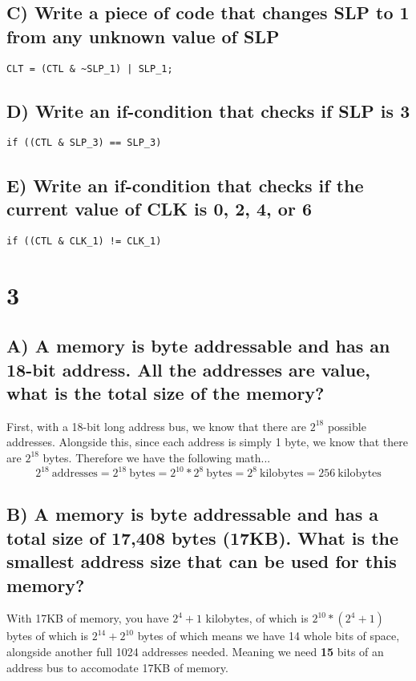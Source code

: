 \documentclass{article}
\begin{document}
\subsection{C) Write a piece of code that changes SLP to 1 from any unknown value of SLP}
\begin{lstlisting}
CLT = (CTL & ~SLP_1) | SLP_1;
\end{lstlisting}

\subsection{D) Write an if-condition that checks if SLP is 3}
\begin{lstlisting}
if ((CTL & SLP_3) == SLP_3)
\end{lstlisting}

\subsection{E) Write an if-condition that checks if the current value of CLK is 0, 2, 4, or 6}
\begin{lstlisting}
if ((CTL & CLK_1) != CLK_1)
\end{lstlisting}

\section{3}
\subsection{A) A memory is byte addressable and has an 18-bit address. All the addresses are value, what is the total size of the memory?}
First, with a 18-bit long address bus, we know that there are $2^18$ possible addresses. Alongside this, since each address is simply 1 byte, we know that there are $2^18$ bytes. Therefore we have the following math...
$$ 2^{18}\ \text{addresses} = 2^{18}\ \text{bytes} = 2^{10}*2^8\ \text{bytes} = 2^8\ \text{kilobytes} = 256\ \text{kilobytes}$$

\subsection{B) A memory is byte addressable and has a total size of 17,408 bytes (17KB). What is the smallest address size that can be used for this memory?}
With 17KB of memory, you have $2^4+1$ kilobytes, of which is $2^{10}*(2^4 + 1)$ bytes of which is $2^{14}+2^{10}$ bytes of which means we have 14 whole bits of space, alongside another full 1024 addresses needed. Meaning we need \textbf{15} bits of an address bus to accomodate 17KB of memory.
\end{document}
